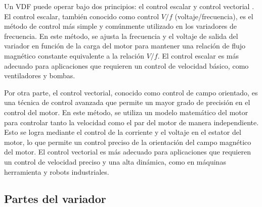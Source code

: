 Un VDF puede operar bajo dos principios: el control escalar y control vectorial \cite{Posadas05}. El control escalar, también conocido como control $V/f$ (voltaje/frecuencia), es el método de control más simple y comúnmente utilizado en los variadores de frecuencia. En este método, se ajusta la frecuencia y el voltaje de salida del variador en función de la carga del motor para mantener una relación de flujo magnético constante equivalente a la relación $V/f$. El control escalar es más adecuado para aplicaciones que requieren un control de velocidad básico, como ventiladores y bombas. 

Por otra parte, el control vectorial, conocido como control de campo orientado, es una técnica de control avanzada que permite un mayor grado de precisión en el control del motor. En este método, se utiliza un modelo matemático del motor para controlar tanto la velocidad como el par del motor de manera independiente. Esto se logra mediante el control de la corriente y el voltaje en el estator del motor, lo que permite un control preciso de la orientación del campo magnético del motor. El control vectorial es más adecuado para aplicaciones que requieren un control de velocidad preciso y una alta dinámica, como en máquinas herramienta y robots industriales.

\subsection{Partes del variador}

